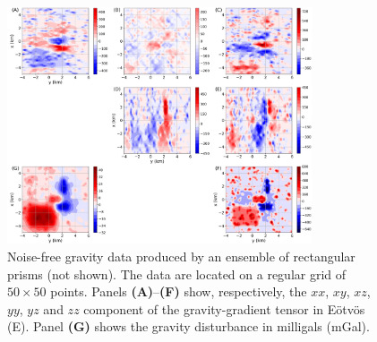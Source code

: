 
\begin{figure}[htbp]
	\begin{center}
			\includegraphics[width=9cm]{Fig/noise-free-data}
		\end{center}
	\caption{
		Noise-free gravity data produced by an ensemble of rectangular prisms (not shown). 
		The data are located on a regular grid of $50 \times 50$ points. 
		Panels \textbf{(A)}--\textbf{(F)} show, respectively, the $xx$, $xy$, $xz$, $yy$, $yz$ and
		$zz$ component of the gravity-gradient tensor in Eötvös (E).
		Panel \textbf{(G)} shows the gravity disturbance in milligals (mGal).
		}
	\label{fig:noise-free-data}
\end{figure}

